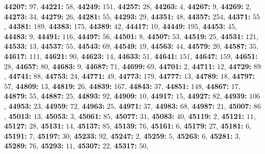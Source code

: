 \textsf{\bfseries 44207:} $97$, \textsf{\bfseries 44221:} $58$, \textsf{\bfseries 44249:} $151$, \textsf{\bfseries 44257:} $28$, \textsf{\bfseries 44263:} $4$, \textsf{\bfseries 44267:} $9$, \textsf{\bfseries 44269:} $2$, \textsf{\bfseries 44273:} $34$, \textsf{\bfseries 44279:} $26$, \textsf{\bfseries 44281:} $55$, \textsf{\bfseries 44293:} $29$, \textsf{\bfseries 44351:} $48$, \textsf{\bfseries 44357:} $254$, \textsf{\bfseries 44371:} $55$, \textsf{\bfseries 44381:} $189$, \textsf{\bfseries 44383:} $175$, \textsf{\bfseries 44389:} $42$, \textsf{\bfseries 44417:} $10$, \textsf{\bfseries 44449:} $195$, \textsf{\bfseries 44453:} $45$, \textsf{\bfseries 44483:} $9$, \textsf{\bfseries 44491:} $116$, \textsf{\bfseries 44497:} $56$, \textsf{\bfseries 44501:} $8$, \textsf{\bfseries 44507:} $53$, \textsf{\bfseries 44519:} $25$, \textsf{\bfseries 44531:} $121$, \textsf{\bfseries 44533:} $13$, \textsf{\bfseries 44537:} $55$, \textsf{\bfseries 44543:} $69$, \textsf{\bfseries 44549:} $19$, \textsf{\bfseries 44563:} $44$, \textsf{\bfseries 44579:} $20$, \textsf{\bfseries 44587:} $35$, \textsf{\bfseries 44617:} $111$, \textsf{\bfseries 44621:} $90$, \textsf{\bfseries 44623:} $14$, \textsf{\bfseries 44633:} $51$, \textsf{\bfseries 44641:} $151$, \textsf{\bfseries 44647:} $159$, \textsf{\bfseries 44651:} $28$, \textsf{\bfseries 44657:} $80$, \textsf{\bfseries 44683:} $9$, \textsf{\bfseries 44687:} $71$, \textsf{\bfseries 44699:} $69$, \textsf{\bfseries 44701:} $2$, \textsf{\bfseries 44711:} $12$, \textsf{\bfseries 44729:} $89$, \textsf{\bfseries 44741:} $88$, \textsf{\bfseries 44753:} $24$, \textsf{\bfseries 44771:} $49$, \textsf{\bfseries 44773:} $179$, \textsf{\bfseries 44777:} $13$, \textsf{\bfseries 44789:} $18$, \textsf{\bfseries 44797:} $57$, \textsf{\bfseries 44809:} $13$, \textsf{\bfseries 44819:} $26$, \textsf{\bfseries 44839:} $167$, \textsf{\bfseries 44843:} $37$, \textsf{\bfseries 44851:} $148$, \textsf{\bfseries 44867:} $17$, \textsf{\bfseries 44879:} $55$, \textsf{\bfseries 44887:} $25$, \textsf{\bfseries 44893:} $92$, \textsf{\bfseries 44909:} $10$, \textsf{\bfseries 44917:} $15$, \textsf{\bfseries 44927:} $82$, \textsf{\bfseries 44939:} $106$, \textsf{\bfseries 44953:} $23$, \textsf{\bfseries 44959:} $72$, \textsf{\bfseries 44963:} $25$, \textsf{\bfseries 44971:} $37$, \textsf{\bfseries 44983:} $68$, \textsf{\bfseries 44987:} $21$, \textsf{\bfseries 45007:} $86$, \textsf{\bfseries 45013:} $13$, \textsf{\bfseries 45053:} $3$, \textsf{\bfseries 45061:} $85$, \textsf{\bfseries 45077:} $31$, \textsf{\bfseries 45083:} $40$, \textsf{\bfseries 45119:} $2$, \textsf{\bfseries 45121:} $11$, \textsf{\bfseries 45127:} $28$, \textsf{\bfseries 45131:} $14$, \textsf{\bfseries 45137:} $85$, \textsf{\bfseries 45139:} $76$, \textsf{\bfseries 45161:} $6$, \textsf{\bfseries 45179:} $27$, \textsf{\bfseries 45181:} $6$, \textsf{\bfseries 45191:} $7$, \textsf{\bfseries 45197:} $30$, \textsf{\bfseries 45233:} $92$, \textsf{\bfseries 45247:} $2$, \textsf{\bfseries 45259:} $5$, \textsf{\bfseries 45263:} $6$, \textsf{\bfseries 45281:} $3$, \textsf{\bfseries 45289:} $76$, \textsf{\bfseries 45293:} $11$, \textsf{\bfseries 45307:} $22$, \textsf{\bfseries 45317:} $50$, 
